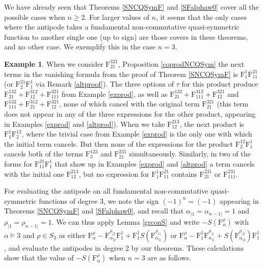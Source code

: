 \documentclass{article}
\theoremstyle{definition}
\newtheorem{ex}[thm]{Example}
\begin{document}
We have already seen that Theorems \ref{SNCQSymF} and \ref{SFalphaw0} cover all the possible cases when $n\geq2$. For larger values of $n$, it seems that the only cases where the antipode takes a fundamental non-commutative quasi-symmetric function to another single one (up to sign) are those covers in these theorems, and no other case. We exemplify this in the case $n=3$.
\begin{ex}
When we consider $\mathrm{F}_{21}^{321}$, Proposition \ref{coprodNCQSym} the next terms in the vanishing formula from the proof of Theorem \ref{SNCQSymF} is $\mathrm{F}_{1}^{1}\mathrm{F}_{11}^{21}$ (or $\mathrm{F}_{2}^{21}\mathrm{F}_{1}^{1}$ via Remark \ref{altproof}). The three options of $\tau$ for this product produce $\mathrm{F}_{21}^{132}+\mathrm{F}_{12}^{312}+\mathrm{F}_{111}^{321}$ from Example \ref{exprod}, as well as $\mathrm{F}_{21}^{132}+\mathrm{F}_{111}^{312}+\mathrm{F}_{12}^{321}$ and $\mathrm{F}_{111}^{132}+\mathrm{F}_{21}^{312}+\mathrm{F}_{12}^{321}$, none of which cancel with the original term $\mathrm{F}_{21}^{321}$ (this term does not appear in any of the three expressions for the other product, appearing in Examples \ref{exprod} and \ref{altprod}). When we take $\mathrm{F}_{12}^{213}$, the next product is $\mathrm{F}_{1}^{1}\mathrm{F}_{2}^{12}$, where the trivial case from Example \ref{exprod} is the only one with which the initial term cancels. But then none of the expressions for the product $\mathrm{F}_{2}^{12}\mathrm{F}_{1}^{1}$ cancels both of the terms $\mathrm{F}_{3}^{123}$ and $\mathrm{F}_{21}^{231}$ simultaneously. Similarly, in two of the forms for $\mathrm{F}_{11}^{21}\mathrm{F}_{1}^{1}$ that show up in Examples \ref{exprod} and \ref{altprod} a term cancels with the initial one $\mathrm{F}_{12}^{213}$, but no expression for $\mathrm{F}_{1}^{1}\mathrm{F}_{11}^{21}$ contains $\mathrm{F}_{21}^{231}$ or $\mathrm{F}_{111}^{231}$. \label{SFn=3}
\end{ex}
For evaluating the antipode on all fundamental non-commutative quasi-symmetric functions of degree 3, we note the sign $(-1)^{n}=(-1)$ appearing in Theorems \ref{SNCQSymF} and \ref{SFalphaw0}, and recall that $\alpha_{|1}=\alpha_{n-1|}=1$ and $\rho_{|1}=\rho_{n-1|}=1$. We can thus apply Lemma \ref{grconS} and write $-S(\mathrm{F}_{\alpha}^{\rho})$ with $\alpha\vDash3$ and $\rho \in S_{3}$ as either $\mathrm{F}_{\alpha}^{\rho}-\mathrm{F}_{\alpha_{|2}}^{\rho_{|2}}\mathrm{F}_{1}^{1}+\mathrm{F}_{1}^{1}S(\mathrm{F}_{\alpha_{1|}}^{\rho_{1|}})$ or $\mathrm{F}_{\alpha}^{\rho}-\mathrm{F}_{1}^{1}\mathrm{F}_{\alpha_{1|}}^{\rho_{1|}}+S(\mathrm{F}_{\alpha_{|2}}^{\rho_{|2}})\mathrm{F}_{1}^{1}$, and evaluate the antipodes in degree 2 by our theorems. These calculations show that the value of $-S(\mathrm{F}_{\alpha}^{\rho})$ when $n=3$ are as follows.
\end{document}
